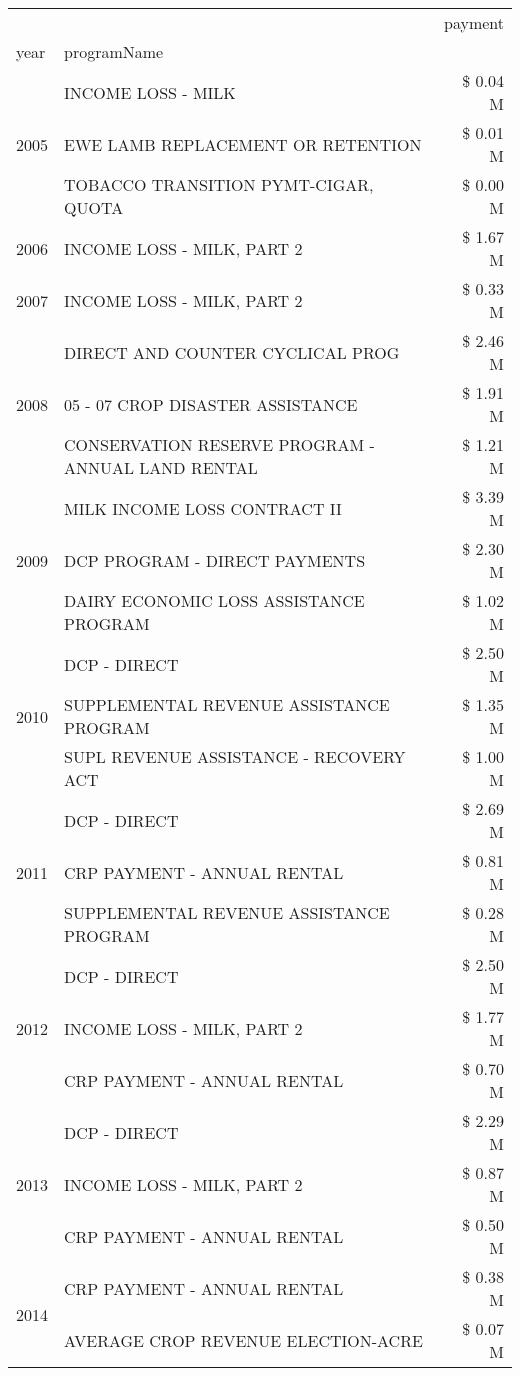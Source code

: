 \begin{tabular}{llr}
\toprule
 &  & payment \\
year & programName &  \\
\midrule
\multirow[t]{3}{*}{2005} & INCOME LOSS - MILK & \$ 0.04 M \\
 & EWE LAMB REPLACEMENT OR RETENTION & \$ 0.01 M \\
 & TOBACCO TRANSITION PYMT-CIGAR, QUOTA & \$ 0.00 M \\
\cline{1-3}
2006 & INCOME LOSS - MILK, PART 2 & \$ 1.67 M \\
\cline{1-3}
2007 & INCOME LOSS - MILK, PART 2 & \$ 0.33 M \\
\cline{1-3}
\multirow[t]{3}{*}{2008} & DIRECT AND COUNTER CYCLICAL PROG & \$ 2.46 M \\
 & 05 - 07 CROP DISASTER ASSISTANCE & \$ 1.91 M \\
 & CONSERVATION RESERVE PROGRAM - ANNUAL LAND RENTAL & \$ 1.21 M \\
\cline{1-3}
\multirow[t]{3}{*}{2009} & MILK INCOME LOSS CONTRACT II & \$ 3.39 M \\
 & DCP PROGRAM - DIRECT PAYMENTS & \$ 2.30 M \\
 & DAIRY ECONOMIC LOSS ASSISTANCE PROGRAM & \$ 1.02 M \\
\cline{1-3}
\multirow[t]{3}{*}{2010} & DCP - DIRECT & \$ 2.50 M \\
 & SUPPLEMENTAL REVENUE ASSISTANCE PROGRAM & \$ 1.35 M \\
 & SUPL REVENUE ASSISTANCE - RECOVERY ACT & \$ 1.00 M \\
\cline{1-3}
\multirow[t]{3}{*}{2011} & DCP - DIRECT & \$ 2.69 M \\
 & CRP PAYMENT - ANNUAL RENTAL & \$ 0.81 M \\
 & SUPPLEMENTAL REVENUE ASSISTANCE PROGRAM & \$ 0.28 M \\
\cline{1-3}
\multirow[t]{3}{*}{2012} & DCP - DIRECT & \$ 2.50 M \\
 & INCOME LOSS - MILK, PART 2 & \$ 1.77 M \\
 & CRP PAYMENT - ANNUAL RENTAL & \$ 0.70 M \\
\cline{1-3}
\multirow[t]{3}{*}{2013} & DCP - DIRECT & \$ 2.29 M \\
 & INCOME LOSS - MILK, PART 2 & \$ 0.87 M \\
 & CRP PAYMENT - ANNUAL RENTAL & \$ 0.50 M \\
\cline{1-3}
\multirow[t]{3}{*}{2014} & CRP PAYMENT - ANNUAL RENTAL & \$ 0.38 M \\
 & AVERAGE CROP REVENUE ELECTION-ACRE & \$ 0.07 M \\

\end{tabular}
